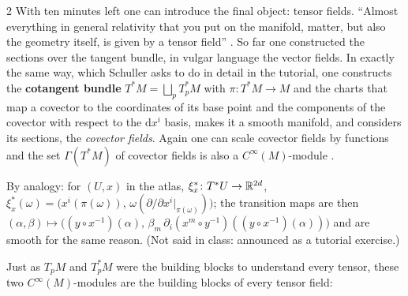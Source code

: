 \begin{paracol}{2}
With ten minutes left one can introduce the final object: tensor fields. ``Almost everything in general relativity that you put on the manifold, matter, but also the geometry itself, is given by a tensor field'' . So far one constructed the sections over the tangent bundle, in vulgar language the vector fields. In exactly the same way, which Schuller asks to do in detail in the tutorial, one constructs the \textbf{cotangent bundle} $T^*M=\bigsqcup_pT^*_pM$ with $\pi\colon T^*M\to M$ and the charts that map a covector to the coordinates of its base point and the components of the covector with respect to the $\mathrm dx^i$ basis, makes it a smooth manifold, and considers its sections, the \emph{covector fields}.
Again one can scale covector fields by functions and the set $\Gamma(T^*M)$ of covector fields is also a $C^\infty(M)$-module .
\begin{coursenote}
By analogy: for $(U,x)$ in the atlas, $\xi^*_x\colon T^*U\to\mathbb{R}^{2d}$, $\xi^*_x(\omega)=\bigl(x^i(\pi(\omega)),\,\omega(\partial/\partial x^i|_{\pi(\omega)})\bigr)$; the transition maps are then $(\alpha,\beta)\mapsto\bigl((y\circ x^{-1})(\alpha),\,\beta_m\,\partial_i(x^m\circ y^{-1})((y\circ x^{-1})(\alpha))\bigr)$ and are smooth for the same reason. (Not said in class: announced as a tutorial exercise.)
\end{coursenote}

Just as $T_pM$ and $T^*_pM$ were the building blocks to understand every tensor, these two $C^\infty(M)$-modules are the building blocks of every tensor field:


\end{paracol}
